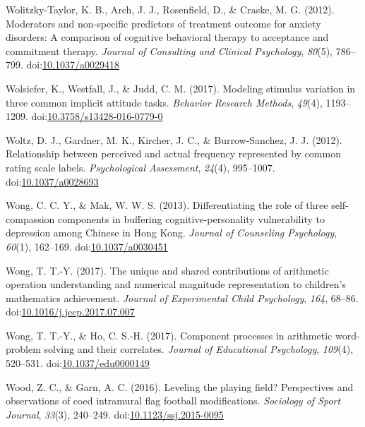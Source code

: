 \documentclass[english,man]{apa6}
\begin{document}
\hypertarget{ref-Wolitzky-Taylor2012}{}
Wolitzky-Taylor, K. B., Arch, J. J., Rosenfield, D., \& Craske, M. G.
(2012). Moderators and non-specific predictors of treatment outcome for
anxiety disorders: A comparison of cognitive behavioral therapy to
acceptance and commitment therapy. \emph{Journal of Consulting and
Clinical Psychology}, \emph{80}(5), 786--799.
doi:\href{https://doi.org/10.1037/a0029418}{10.1037/a0029418}

\hypertarget{ref-Wolsiefer2017}{}
Wolsiefer, K., Westfall, J., \& Judd, C. M. (2017). Modeling stimulus
variation in three common implicit attitude tasks. \emph{Behavior
Research Methods}, \emph{49}(4), 1193--1209.
doi:\href{https://doi.org/10.3758/s13428-016-0779-0}{10.3758/s13428-016-0779-0}

\hypertarget{ref-Woltz2012}{}
Woltz, D. J., Gardner, M. K., Kircher, J. C., \& Burrow-Sanchez, J. J.
(2012). Relationship between perceived and actual frequency represented
by common rating scale labels. \emph{Psychological Assessment},
\emph{24}(4), 995--1007.
doi:\href{https://doi.org/10.1037/a0028693}{10.1037/a0028693}

\hypertarget{ref-Wong2013}{}
Wong, C. C. Y., \& Mak, W. W. S. (2013). Differentiating the role of
three self-compassion components in buffering cognitive-personality
vulnerability to depression among Chinese in Hong Kong. \emph{Journal of
Counseling Psychology}, \emph{60}(1), 162--169.
doi:\href{https://doi.org/10.1037/a0030451}{10.1037/a0030451}

\hypertarget{ref-Wong2017}{}
Wong, T. T.-Y. (2017). The unique and shared contributions of arithmetic
operation understanding and numerical magnitude representation to
children's mathematics achievement. \emph{Journal of Experimental Child
Psychology}, \emph{164}, 68--86.
doi:\href{https://doi.org/10.1016/j.jecp.2017.07.007}{10.1016/j.jecp.2017.07.007}

\hypertarget{ref-Wong2017a}{}
Wong, T. T.-Y., \& Ho, C. S.-H. (2017). Component processes in
arithmetic word-problem solving and their correlates. \emph{Journal of
Educational Psychology}, \emph{109}(4), 520--531.
doi:\href{https://doi.org/10.1037/edu0000149}{10.1037/edu0000149}

\hypertarget{ref-Wood2016}{}
Wood, Z. C., \& Garn, A. C. (2016). Leveling the playing field?
Perspectives and observations of coed intramural flag football
modifications. \emph{Sociology of Sport Journal}, \emph{33}(3),
240--249.
doi:\href{https://doi.org/10.1123/ssj.2015-0095}{10.1123/ssj.2015-0095}
\end{document}
